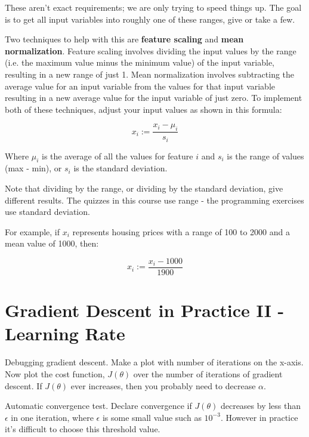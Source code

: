 \documentclass[10pt,a4paper,UTF8]{article}
\begin{document}
These aren't exact requirements; we are only trying to speed things up. The goal is to get all input variables into roughly one of these ranges, give or take a few.

Two techniques to help with this are \textbf{feature scaling} and \textbf{mean normalization}. Feature scaling involves dividing the input values by the range (i.e. the maximum value minus the minimum value) of the input variable, resulting in a new range of just 1. Mean normalization involves subtracting the average value for an input variable from the values for that input variable resulting in a new average value for the input variable of just zero. To implement both of these techniques, adjust your input values as shown in this formula:

\begin{equation}
\label{eq:4}
x_{i} := \frac{x_{i}-\mu_{i}}{s_{i}}
\end{equation}

Where \(\mu_{i}\) is the average of all the values for feature \(i\) and \(s_{i}\) is the range of values (max - min), or \(s_{i}\) is the standard deviation.

Note that dividing by the range, or dividing by the standard deviation, give different results. The quizzes in this course use range - the programming exercises use standard deviation.

For example, if \(x_{i}\) represents housing prices with a range of 100 to 2000 and a mean value of 1000, then:

\begin{equation}
\label{eq:5}
x_{i} := \frac{x_{i}-1000}{1900}
\end{equation}
\section{Gradient Descent in Practice II - Learning Rate}
\label{sec:orgab6be1c}


Debugging gradient descent. Make a plot with number of iterations on the x-axis. Now plot the cost function, \(J(\theta)\) over the number of iterations of gradient descent. If \(J(\theta)\) ever increases, then you probably need to decrease \(\alpha\).

Automatic convergence test. Declare convergence if \(J(\theta)\) decreases by less than \(\epsilon\) in one iteration, where \(\epsilon\) is some small value such as \(10^{-3}\). However in practice it's difficult to choose this threshold value.
\end{document}
